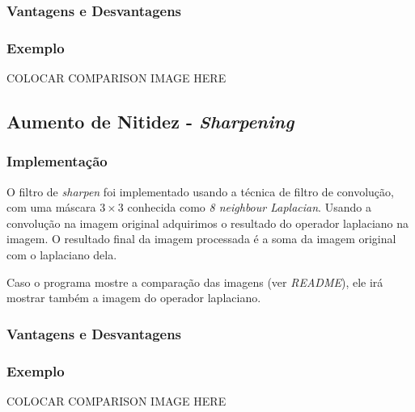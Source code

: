 \subsubsection{Vantagens e Desvantagens}
\subsubsection{Exemplo}
COLOCAR COMPARISON IMAGE HERE

\subsection{Aumento de Nitidez - \textit{Sharpening}}
\subsubsection{Implementação}
O filtro de \textit{sharpen} foi implementado usando a técnica de filtro de convolução, com uma máscara $3\times 3$
conhecida como \textit{8 neighbour Laplacian}. Usando a convolução na imagem original adquirimos o resultado do operador
laplaciano na imagem. O resultado final da imagem processada é a soma da imagem original com o laplaciano dela.

Caso o programa mostre a comparação das imagens (ver \textit{README}), ele irá mostrar também a imagem do operador 
laplaciano. 

\subsubsection{Vantagens e Desvantagens}
\subsubsection{Exemplo}
COLOCAR COMPARISON IMAGE HERE

